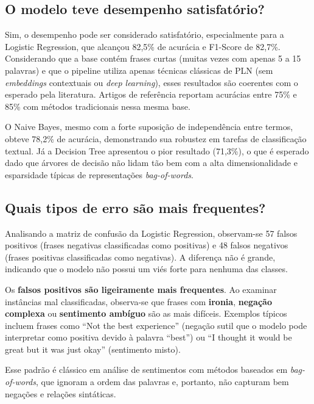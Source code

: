\documentclass[12pt,a4paper]{article}
\begin{document}
\subsection{O modelo teve desempenho satisfatório?}

Sim, o desempenho pode ser considerado satisfatório, especialmente para a Logistic Regression, que alcançou 82,5\% de acurácia e F1-Score de 82,7\%. Considerando que a base contém frases curtas (muitas vezes com apenas 5 a 15 palavras) e que o pipeline utiliza apenas técnicas clássicas de PLN (sem \textit{embeddings} contextuais ou \textit{deep learning}), esses resultados são coerentes com o esperado pela literatura. Artigos de referência reportam acurácias entre 75\% e 85\% com métodos tradicionais nessa mesma base.

O Naive Bayes, mesmo com a forte suposição de independência entre termos, obteve 78,2\% de acurácia, demonstrando sua robustez em tarefas de classificação textual. Já a Decision Tree apresentou o pior resultado (71,3\%), o que é esperado dado que árvores de decisão não lidam tão bem com a alta dimensionalidade e esparsidade típicas de representações \textit{bag-of-words}.

\subsection{Quais tipos de erro são mais frequentes?}

Analisando a matriz de confusão da Logistic Regression, observam-se 57 falsos positivos (frases negativas classificadas como positivas) e 48 falsos negativos (frases positivas classificadas como negativas). A diferença não é grande, indicando que o modelo não possui um viés forte para nenhuma das classes.

Os \textbf{falsos positivos são ligeiramente mais frequentes}. Ao examinar instâncias mal classificadas, observa-se que frases com \textbf{ironia}, \textbf{negação complexa} ou \textbf{sentimento ambíguo} são as mais difíceis. Exemplos típicos incluem frases como ``Not the best experience'' (negação sutil que o modelo pode interpretar como positiva devido à palavra ``best'') ou ``I thought it would be great but it was just okay'' (sentimento misto).

Esse padrão é clássico em análise de sentimentos com métodos baseados em \textit{bag-of-words}, que ignoram a ordem das palavras e, portanto, não capturam bem negações e relações sintáticas.
\end{document}
